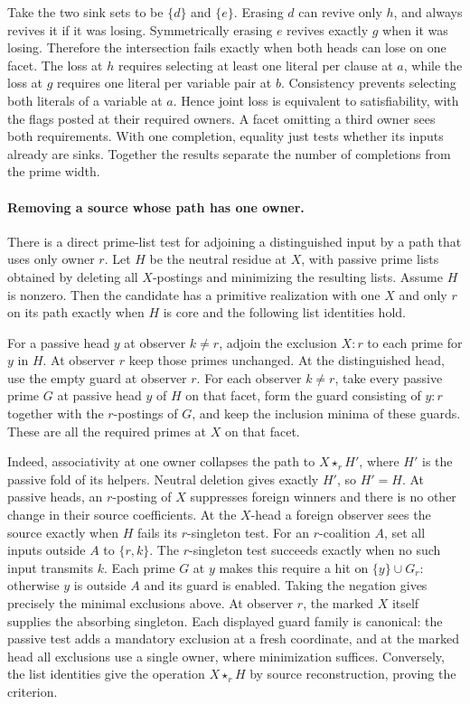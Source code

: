 Take the two sink sets to be $\{d\}$ and $\{e\}$.
Erasing $d$ can revive only $h$, and always
revives it if it was losing. Symmetrically erasing
$e$ revives exactly $g$ when it was losing.
Therefore the intersection fails exactly when
both heads can lose on one facet. The loss at
$h$ requires selecting at least one literal
per clause at $a$, while the loss at $g$
requires one literal per variable pair at $b$.
Consistency prevents selecting both literals of
a variable at $a$. Hence joint loss is equivalent
to satisfiability, with the flags posted at their
required owners. A facet omitting a third owner
sees both requirements. With one completion,
equality just tests whether its inputs already
are sinks. Together the results separate the
number of completions from the prime width.

\paragraph{Removing a source whose path has one owner.}
There is a direct prime-list test for adjoining a
distinguished input by a path that uses only owner $r$.
Let $H$ be the neutral residue at $X$, with passive
prime lists obtained by deleting all $X$-postings and
minimizing the resulting lists. Assume $H$ is nonzero.
Then the candidate has a primitive realization with
one $X$ and only $r$ on its path exactly when $H$ is
core and the following list identities hold.

For a passive head $y$ at observer $k\ne r$, adjoin
the exclusion $X:r$ to each prime for $y$ in $H$.
At observer $r$ keep those primes unchanged. At the
distinguished head, use the empty guard at observer
$r$. For each observer $k\ne r$, take every passive
prime $G$ at passive head $y$ of $H$ on that facet,
form the guard consisting of $y:r$ together with
the $r$-postings of $G$, and keep the inclusion
minima of these guards. These are all the required
primes at $X$ on that facet.

Indeed, associativity at one owner collapses the
path to $X\star_r H'$, where $H'$ is the passive
fold of its helpers. Neutral deletion gives exactly
$H'$, so $H'=H$. At passive heads, an $r$-posting
of $X$ suppresses foreign winners and there is no
other change in their source coefficients. At the
$X$-head a foreign observer sees the source exactly
when $H$ fails its $r$-singleton test. For an
$r$-coalition $A$, set all inputs outside $A$ to
$\{r,k\}$. The $r$-singleton test succeeds exactly
when no such input transmits $k$. Each prime $G$
at $y$ makes this require a hit on $\{y\}\cup G_r$:
otherwise $y$ is outside $A$ and its guard is
enabled. Taking the negation gives precisely the
minimal exclusions above. At observer $r$, the
marked $X$ itself supplies the absorbing singleton.
Each displayed guard family is canonical: the
passive test adds a mandatory exclusion at a fresh
coordinate, and at the marked head all exclusions
use a single owner, where minimization suffices.
Conversely, the list identities give the operation
$X\star_r H$ by source reconstruction, proving
the criterion.

